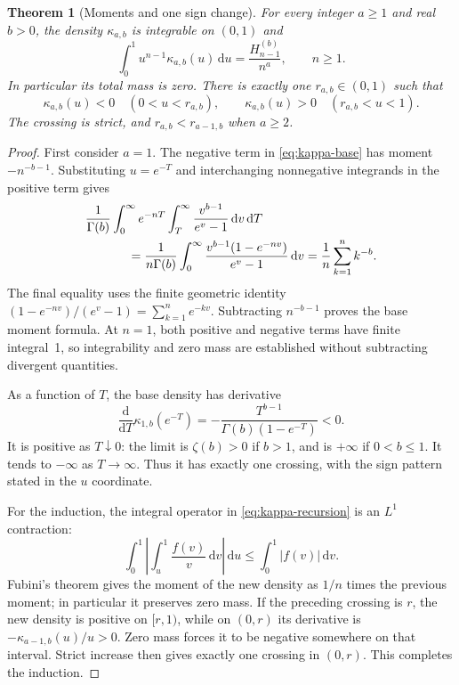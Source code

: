 \documentclass[11pt,a4paper]{article}
\numberwithin{equation}{section}
\newtheorem{theorem}{Theorem}[section]
\theoremstyle{definition}
\theoremstyle{remark}
\newcommand{\dd}{\,\mathrm{d}}
\begin{document}
\begin{theorem}[Moments and one sign change]\label{thm:kernel}
For every integer $a\ge1$ and real $b>0$, the density $\kappa_{a,b}$ is integrable on $(0,1)$ and
\begin{equation}\label{eq:kernel-moments}
 \int_0^1u^{n-1}\kappa_{a,b}(u)\dd u
 =\frac{H_{n-1}^{(b)}}{n^a},\qquad n\ge1.
\end{equation}
In particular its total mass is zero. There is exactly one $r_{a,b}\in(0,1)$ such that
\begin{equation}\label{eq:kernel-sign}
 \kappa_{a,b}(u)<0\quad(0<u<r_{a,b}),\qquad
 \kappa_{a,b}(u)>0\quad(r_{a,b}<u<1).
\end{equation}
The crossing is strict, and $r_{a,b}<r_{a-1,b}$ when $a\ge2$.
\end{theorem}
\begin{proof}
First consider $a=1$. The negative term in \eqref{eq:kappa-base} has moment $-n^{-b-1}$. Substituting $u=e^{-T}$ and interchanging nonnegative integrands in the positive term gives
\begin{align*}
 &\frac1{\Gamma(b)}\int_0^\infty e^{-nT}
       \int_T^\infty\frac{v^{b-1}}{e^v-1}\dd v\dd T\\
 &\hspace{12mm}=\frac1{n\Gamma(b)}\int_0^\infty
       \frac{v^{b-1}(1-e^{-nv})}{e^v-1}\dd v
 =\frac1n\sum_{k=1}^n k^{-b}.
\end{align*}
The final equality uses the finite geometric identity
$(1-e^{-nv})/(e^v-1)=\sum_{k=1}^n e^{-kv}$.
Subtracting $n^{-b-1}$ proves the base moment formula. At $n=1$, both positive and negative terms have finite integral~1, so integrability and zero mass are established without subtracting divergent quantities.

As a function of $T$, the base density has derivative
\begin{equation}\label{eq:kappa-base-derivative}
 \frac{\mathrm d}{\mathrm dT}\kappa_{1,b}(e^{-T})
 =-\frac{T^{b-1}}{\Gamma(b)(1-e^{-T})}<0.
\end{equation}
It is positive as $T\downarrow0$: the limit is $\zeta(b)>0$ if $b>1$, and is $+\infty$ if $0<b\le1$. It tends to $-\infty$ as $T\to\infty$. Thus it has exactly one crossing, with the sign pattern stated in the $u$ coordinate.

For the induction, the integral operator in \eqref{eq:kappa-recursion} is an $L^1$ contraction:
\[
 \int_0^1\left|\int_u^1\frac{f(v)}v\dd v\right|\dd u
 \le\int_0^1|f(v)|\dd v.
\]
Fubini's theorem gives the moment of the new density as $1/n$ times the previous moment; in particular it preserves zero mass. If the preceding crossing is $r$, the new density is positive on $[r,1)$, while on $(0,r)$ its derivative is $-\kappa_{a-1,b}(u)/u>0$. Zero mass forces it to be negative somewhere on that interval. Strict increase then gives exactly one crossing in $(0,r)$. This completes the induction.
\end{proof}
\end{document}
